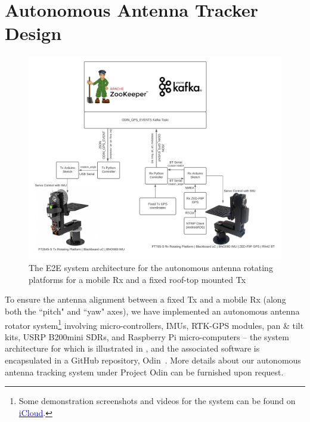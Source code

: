\documentclass[12pt]{article}
\newcommand{\areaofinterestfigwidth}{1.0\textwidth}
\begin{document}
\section{Autonomous Antenna Tracker Design}\label{S3.6}
    \begin{figure}
        \centering
        \includegraphics[width=\areaofinterestfigwidth]{figs/Odin_E2E_Design_Architecture.png}
        \caption{The E2E system architecture for the autonomous antenna rotating platforms for a mobile Rx and a fixed roof-top mounted Tx}
        \label{fig:arch}
    \end{figure}
    To ensure the antenna alignment between a fixed Tx and a mobile Rx (along both the ``pitch" and ``yaw" axes), we have implemented an autonomous antenna rotator system\footnote{Some demonstration screenshots and videos for the system can be found on \href{https://www.icloud.com/iclouddrive/0wfVsZTUo2RYsgWSQ9IMFRSYA\#Demo_Videos}{\textcolor{blue}{iCloud}}.} involving micro-controllers, IMUs, RTK-GPS modules, pan \& tilt kits, USRP B200mini SDRs, and Raspberry Pi micro-computers -- the system architecture for which is illustrated in , and the associated software is encapsulated in a GitHub repository, Odin~\cite{odin}. More details about our autonomous antenna tracking system under Project Odin can be furnished upon request.
\end{document}
